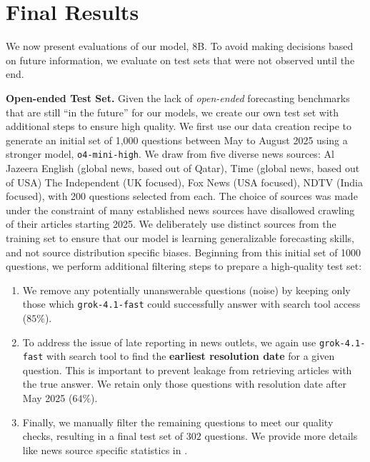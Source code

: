 \vspace{-0.2cm}
\section{Final Results}
\label{sec:results}

 We now present evaluations of our model, \ourmodel 8B. To avoid making decisions based on future information, we evaluate on test sets that were not observed until the end.\vspace{0.15cm}

\textbf{Open-ended Test Set.} Given the lack of \emph{open-ended} forecasting benchmarks that are still ``in the future'' for our models, we create our own test set with additional steps to ensure high quality. We first use our data creation recipe to generate an initial set of 1,000 questions between May to August 2025 using a stronger model, \texttt{o4-mini-high}. We draw from five diverse news sources: Al Jazeera English (global news, based out of Qatar), Time (global news, based out of USA) The Independent (UK focused), Fox News (USA focused), NDTV (India focused), with 200 questions selected from each. The choice of sources was made under the constraint of many established news sources have disallowed crawling of their articles starting 2025.
We deliberately use distinct sources from the training set to ensure that our model is learning generalizable forecasting skills, and not source distribution specific biases. Beginning from this initial set of 1000 questions, we perform additional filtering steps to prepare a high-quality test set: 
\begin{enumerate}
    \item We remove any potentially unanswerable questions (noise) by keeping only those which \texttt{grok-4.1-fast} could successfully answer with search tool access ($85\%$).
    \item To address the issue of late reporting in news outlets, we again use \texttt{grok-4.1-fast} with search tool to find the \textbf{earliest resolution date} for a given question. This is important to prevent leakage from retrieving articles with the true answer. We retain only those questions with resolution date after May 2025 ($64\%$).
    \item Finally, we manually filter the remaining questions to meet our quality checks, resulting in a final test set of $302$ questions. We provide more details like news source specific statistics in .
\end{enumerate} 

